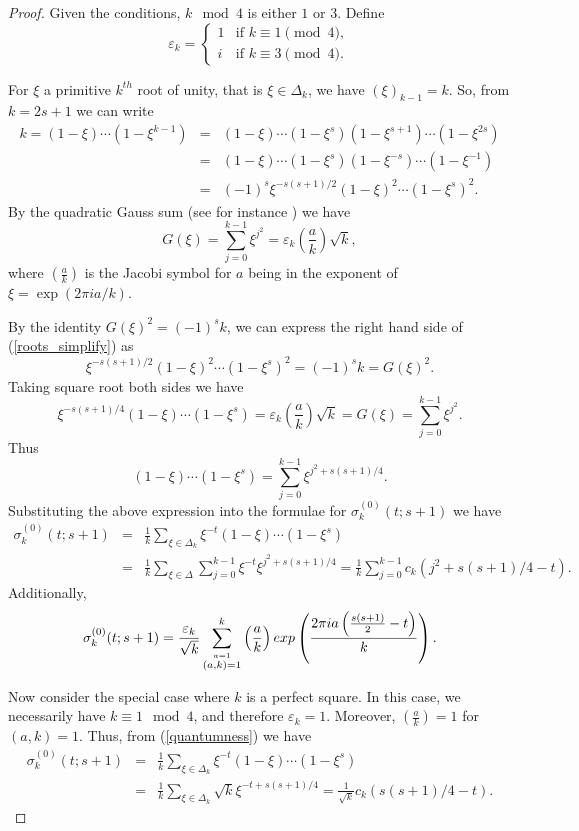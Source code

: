 \documentclass[12pt]{article}
\begin{document}
\begin{proof}
Given the conditions, $k \mod 4$ is either $1$ or $3$. Define 
\[
\varepsilon_k = \begin{cases}
1 & \text{if } k \equiv 1 \pmod{4}, \\
i & \text{if } k \equiv 3 \pmod{4}.
\end{cases}
\]

For $\xi$ a primitive $k^{th}$ root of unity, that is $\xi\in \Delta_{k}$, we have $(\xi)_{k-1}=k$. So, from $k=2s+1$ we can write  
\begin{eqnarray}
 \nonumber k=(1-\xi)\cdots(1-\xi^{k-1})&=&(1-\xi)\cdots(1-\xi^{s})(1-\xi^{s+1})\cdots(1-\xi^{2s})\\
 \nonumber &=&(1-\xi)\cdots(1-\xi^{s})(1-\xi^{-s})\cdots(1-\xi^{-1})\\
  &=& (-1)^{s}\xi^{-s(s+1)/2}(1-\xi)^{2}\cdots(1-\xi^{s})^{2}.\label{roots_simplify}
\end{eqnarray}
By the quadratic Gauss sum (see for instance \cite{bressoud}) we have 
$$
G(\xi)=\sum_{j=0}^{k-1}\xi^{j^{2}}=\varepsilon_{k}\left(\frac{a}{k}\right)\sqrt{k},
$$
where $\left(\frac{a}{k}\right)$ is the Jacobi symbol for $a$ being in the exponent of $ \xi = \exp\left(2\pi i a/k \right)$.

By the identity $G(\xi)^{2}=(-1)^{s}k$, we can express the right hand side of (\ref{roots_simplify}) as  
$$
\xi^{-s(s+1)/2}(1-\xi)^{2}\cdots(1-\xi^{s})^{2}= (-1)^{s}k=G(\xi)^{2}.
$$
Taking square root both sides we have 
\begin{equation}\label{quantumness}
\xi^{-s(s+1)/4}(1-\xi)\cdots(1-\xi^{s})=\varepsilon_{k}\left(\frac{a}{k}\right)\sqrt{k}=G(\xi)=\sum_{j=0}^{k-1}\xi^{j^{2}}.
\end{equation}
Thus 
$$
(1-\xi)\cdots(1-\xi^{s})=\sum_{j=0}^{k-1}\xi^{j^{2}+s(s+1)/4}.
$$
Substituting the above expression into the formulae for $\sigma_{k}^{(0)}(t;s+1)$ we have 
\begin{eqnarray}
\nonumber \sigma^{(0)}_{k}(t;s+1)&=&\frac{1}{k}\sum_{\xi\in \Delta_{k}}\xi^{-t}(1-\xi)\cdots(1-\xi^{s})\\
\nonumber &=& \frac{1}{k}\sum_{\xi\in \Delta}\sum_{j=0}^{k-1}\xi^{-t}\xi^{j^{2}+s(s+1)/4}= \frac{1}{k}\sum_{j=0}^{k-1}c_{k}(j^{2}+s(s+1)/4-t).
\end{eqnarray}
Additionally,  
$$
\sigma_{k}^{(0)}(t;s+1)=\frac{\varepsilon_k}{\sqrt{k}}\sum_{\stackrel{a=1}{(a,k)=1}}^{k} \left(\frac{a}{k}\right) \textnormal{exp}\left(\frac{2\pi ia\left(\frac{s(s+1)}{2}-t\right)}{k}\right).
$$

Now consider the special case where $k$ is a perfect square. In this case, we necessarily have $k\equiv 1 \mod 4$, and therefore $\varepsilon_{k}=1$. Moreover, $\left(\frac{a}{k}\right)=1$ for $(a,k)=1$. Thus, from (\ref{quantumness}) we have
\begin{eqnarray}
\nonumber \sigma_{k}^{(0)}(t;s+1) &=& \frac{1}{k} \sum_{\xi \in \Delta_{k}} \xi^{-t} (1 - \xi) \cdots (1 - \xi^{s}) \\
\nonumber &=& \frac{1}{k} \sum_{\xi \in \Delta_{k}} \sqrt{k} \xi^{-t + s(s+1)/4} = \frac{1}{\sqrt{k}} c_{k}(s(s+1)/4 - t).
\end{eqnarray}

\end{proof}
\end{document}
